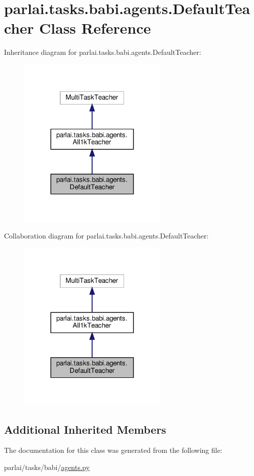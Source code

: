 \hypertarget{classparlai_1_1tasks_1_1babi_1_1agents_1_1DefaultTeacher}{}\section{parlai.\+tasks.\+babi.\+agents.\+Default\+Teacher Class Reference}
\label{classparlai_1_1tasks_1_1babi_1_1agents_1_1DefaultTeacher}


Inheritance diagram for parlai.\+tasks.\+babi.\+agents.\+Default\+Teacher\+:
\nopagebreak
\begin{figure}[H]
\begin{center}
\leavevmode
\includegraphics[width=203pt]{classparlai_1_1tasks_1_1babi_1_1agents_1_1DefaultTeacher__inherit__graph}
\end{center}
\end{figure}


Collaboration diagram for parlai.\+tasks.\+babi.\+agents.\+Default\+Teacher\+:
\nopagebreak
\begin{figure}[H]
\begin{center}
\leavevmode
\includegraphics[width=203pt]{classparlai_1_1tasks_1_1babi_1_1agents_1_1DefaultTeacher__coll__graph}
\end{center}
\end{figure}
\subsection*{Additional Inherited Members}


The documentation for this class was generated from the following file\+:\begin{DoxyCompactItemize}
\item 
parlai/tasks/babi/\hyperlink{parlai_2tasks_2babi_2agents_8py}{agents.\+py}\end{DoxyCompactItemize}
